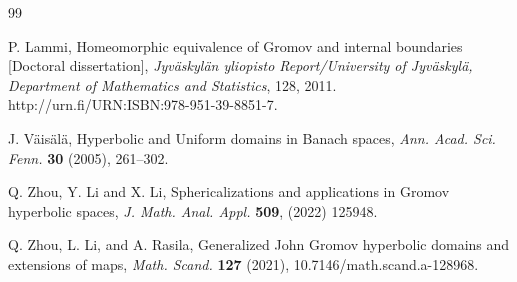 \documentclass[a4paper,12pt]{amsart}
\theoremstyle{definition}
\begin{document}
\begin{thebibliography}{99}
		
		{\sc P. Lammi}, Homeomorphic equivalence of Gromov and internal boundaries [Doctoral dissertation], {\it Jyv\"askyl\"an yliopisto Report/University of Jyv\"askyl\"a, Department of Mathematics and Statistics}, 128, 2011. http://urn.fi/URN:ISBN:978-951-39-8851-7.
		
		{\sc J. V\"ais\"al\"a}, Hyperbolic and Uniform domains in Banach spaces, {\it Ann. Acad. Sci. Fenn.} \textbf{30} (2005), 261--302.
		
		{\sc Q. Zhou}, {\sc Y. Li} and {\sc X. Li}, Sphericalizations and applications in Gromov hyperbolic spaces, {\it J. Math. Anal. Appl.} {\bf 509}, (2022) 125948.
		
		{\sc Q. Zhou}, {\sc L. Li}, and {\sc A. Rasila}, Generalized John Gromov hyperbolic domains and extensions of maps, {\it Math. Scand.} {\bf 127} (2021), 10.7146/math.scand.a-128968.
		
		
		
		
		
	\end{thebibliography}
\end{document}
